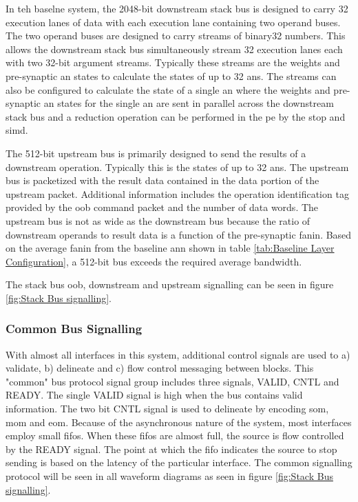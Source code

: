 In teh baselne system, the 2048-bit downstream stack bus is designed to carry 32 execution lanes of data with each execution lane containing two operand buses. 
The two operand buses are designed to carry streams of \ac{binary32} numbers.
This allows the downstream stack bus simultaneously stream 32 execution lanes each with two 32-bit argument streams. 
Typically these streams are the weights and pre-synaptic \ac{an} states to calculate the states of up to 32 \acp{an}. 
The streams can also be configured to calculate the state of a single \ac{an} where the weights and pre-synaptic \ac{an} states for the single \ac{an} are sent in parallel across the downstream stack bus and a reduction operation can be performed in the \ac{pe} by the \ac{stop} and \ac{simd}.

The 512-bit upstream bus is primarily designed to send the results of a downstream operation. Typically this is the states of up to 32 \acp{an}.
The upstream bus is packetized with the result data contained in the data portion of the upstream packet.
Additional information includes the operation identification tag provided by the \ac{oob} command packet and the number of data words.
The upstream bus is not as wide as the downstream bus because the ratio of downstream operands to result data is a function of the pre-synaptic fanin.
Based on the average fanin from the baseline \ac{ann} shown in table \ref{tab:Baseline Layer Configuration}, a 512-bit bus exceeds the required average bandwidth.

The stack bus \ac{oob}, downstream and upstream signalling can be seen in figure \ref{fig:Stack Bus signalling}.

\subsubsection{Common Bus Signalling}
\label{sec:Common Bus Signalling}

With almost all interfaces in this system, additional control signals are used to a) validate, b) delineate and c) flow control messaging between blocks.
This "common" bus protocol signal group includes three signals, VALID, CNTL and READY. 
The single VALID signal is high when the bus contains valid information. The two bit CNTL signal is used to delineate by encoding \ac{som}, \ac{mom} and \ac{eom}.
Because of the asynchronous nature of the system, most interfaces employ small \acp{fifo}. When these \acp{fifo} are almost full, the source is flow controlled by the READY signal. 
The point at which the \ac{fifo} indicates the source to stop sending is based on the latency of the particular interface. 
The common signalling protocol will be seen in all waveform diagrams as seen in figure \ref{fig:Stack Bus signalling}.


